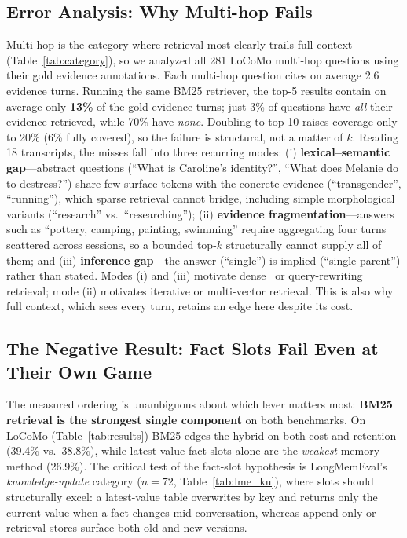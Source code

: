 \documentclass[conference]{IEEEtran}
\begin{document}
\subsection{Error Analysis: Why Multi-hop Fails}
\label{sec:error}

Multi-hop is the category where retrieval most clearly trails full context (Table~\ref{tab:category}), so we analyzed all 281 LoCoMo multi-hop questions using their gold evidence annotations. Each multi-hop question cites on average 2.6 evidence turns. Running the same BM25 retriever, the top-5 results contain on average only \textbf{13\%} of the gold evidence turns; just 3\% of questions have \emph{all} their evidence retrieved, while 70\% have \emph{none}. Doubling to top-10 raises coverage only to 20\% (6\% fully covered), so the failure is structural, not a matter of $k$. Reading 18 transcripts, the misses fall into three recurring modes: (i) \textbf{lexical--semantic gap}---abstract questions (``What is Caroline's identity?'', ``What does Melanie do to destress?'') share few surface tokens with the concrete evidence (``transgender'', ``running''), which sparse retrieval cannot bridge, including simple morphological variants (``research'' vs.\ ``researching''); (ii) \textbf{evidence fragmentation}---answers such as ``pottery, camping, painting, swimming'' require aggregating four turns scattered across sessions, so a bounded top-$k$ structurally cannot supply all of them; and (iii) \textbf{inference gap}---the answer (``single'') is implied (``single parent'') rather than stated. Modes (i) and (iii) motivate dense~\cite{karpukhin2020dense} or query-rewriting retrieval; mode (ii) motivates iterative or multi-vector retrieval. This is also why full context, which sees every turn, retains an edge here despite its cost.

\subsection{The Negative Result: Fact Slots Fail Even at Their Own Game}
\label{sec:slots-honest}

The measured ordering is unambiguous about which lever matters most: \textbf{BM25 retrieval is the strongest single component} on both benchmarks. On LoCoMo (Table~\ref{tab:results}) BM25 edges the hybrid on both cost and retention (39.4\% vs.\ 38.8\%), while latest-value fact slots alone are the \emph{weakest} memory method (26.9\%). The critical test of the fact-slot hypothesis is LongMemEval's \emph{knowledge-update} category ($n=72$, Table~\ref{tab:lme_ku}), where slots should structurally excel: a latest-value table overwrites by key and returns only the current value when a fact changes mid-conversation, whereas append-only or retrieval stores surface both old and new versions.
\end{document}
